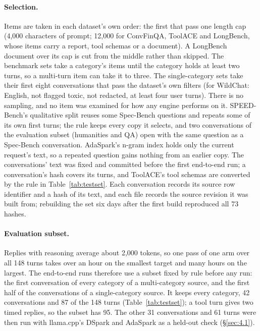 \documentclass[10pt,twocolumn,letterpaper]{article}
\begin{document}
\paragraph{Selection.} Items are taken in each dataset's own order: the first that pass one length cap (4,000 characters of prompt; 12,000 for ConvFinQA, ToolACE and LongBench, whose items carry a report, tool schemas or a document). A LongBench document over its cap is cut from the middle rather than skipped. The benchmark sets take a category's items until the category holds at least two turns, so a multi-turn item can take it to three. The single-category sets take their first eight conversations that pass the dataset's own filters (for WildChat: English, not flagged toxic, not redacted, at least four user turns). There is no sampling, and no item was examined for how any engine performs on it. SPEED-Bench's qualitative split reuses some Spec-Bench questions and repeats some of its own first turns; the rule keeps every copy it selects, and two conversations of the evaluation subset (humanities and QA) open with the same question as a Spec-Bench conversation. AdaSpark's n-gram index holds only the current request's text, so a repeated question gains nothing from an earlier copy. The conversations' text was fixed and committed before the first end-to-end run; a conversation's hash covers its turns, and ToolACE's tool schemas are converted by the rule in Table~\ref{tab:testset}. Each conversation records its source row identifier and a hash of its text, and each file records the source revision it was built from; rebuilding the set six days after the first build reproduced all 73 hashes.

\paragraph{Evaluation subset.} Replies with reasoning average about 2,000 tokens, so one pass of one arm over all 148 turns takes over an hour on the smallest target and many hours on the largest. The end-to-end runs therefore use a subset fixed by rule before any run: the first conversation of every category of a multi-category source, and the first half of the conversations of a single-category source. It keeps every category, 42 conversations and 87 of the 148 turns (Table~\ref{tab:testset}); a tool turn gives two timed replies, so the subset has 95. The other 31 conversations and 61 turns were then run with llama.cpp's DSpark and AdaSpark as a held-out check (\S\ref{sec:4.1}).
\end{document}
